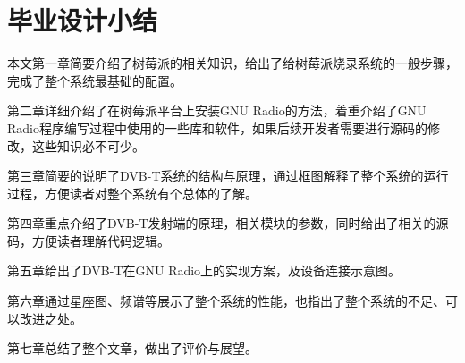 \renewcommand{\baselinestretch}{1.5}
\fontsize{12pt}{13pt}\selectfont
{}
\chapter*{毕业设计小结}

\par 本文第一章简要介绍了树莓派的相关知识，给出了给树莓派烧录系统的一般步骤，完成了整个系统最基础的配置。
\par 第二章详细介绍了在树莓派平台上安装GNU Radio的方法，着重介绍了GNU Radio程序编写过程中使用的一些库和软件，如果后续开发者需要进行源码的修改，这些知识必不可少。
\par 第三章简要的说明了DVB-T系统的结构与原理，通过框图解释了整个系统的运行过程，方便读者对整个系统有个总体的了解。
\par 第四章重点介绍了DVB-T发射端的原理，相关模块的参数，同时给出了相关的源码，方便读者理解代码逻辑。
\par 第五章给出了DVB-T在GNU Radio上的实现方案，及设备连接示意图。
\par 第六章通过星座图、频谱等展示了整个系统的性能，也指出了整个系统的不足、可以改进之处。
\par 第七章总结了整个文章，做出了评价与展望。

\clearpage